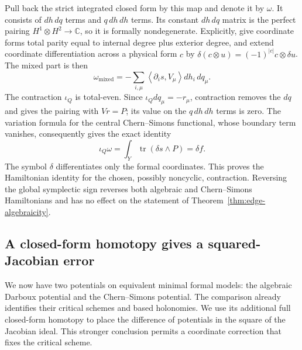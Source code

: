 Pull back the strict integrated closed form by this map and denote it
by \(\omega\).  It consists of \(dh\,dq\) terms and
\(q\,dh\,dh\) terms.  Its constant \(dh\,dq\) matrix is the perfect
pairing \(H^1\otimes H^2\to\mathbb C\), so it is formally
nondegenerate.  Explicitly, give coordinate forms total parity equal
to internal degree plus exterior degree, and extend coordinate
differentiation across a physical form \(c\) by
\(\delta(c\otimes u)=(-1)^{|c|}c\otimes\delta u\).
The mixed part is then
\[
 \omega_{\mathrm{mixed}}
   =-\sum_{i,\mu}\left\langle\partial_i s,V_\mu\right\rangle
                                                  dh_i\,dq_\mu.
\]
The contraction \(\iota_Q\) is total-even.  Since
\(\iota_Qdq_\mu=-r_\mu\), contraction removes the \(dq\) and gives
the pairing with \(Vr=P\); its value on the \(q\,dh\,dh\) terms
is zero.  The variation formula for the central
Chern--Simons functional, whose boundary term vanishes, consequently
gives the exact identity
\begin{equation}
\label{eq:transferred-hamiltonian}
                 \iota_Q\omega
                   =\int_Y\operatorname{tr}(\delta s\wedge P)
                   =\delta f.
\end{equation}
The symbol \(\delta\) differentiates only the formal coordinates.
This proves the Hamiltonian identity for the chosen, possibly
noncyclic, contraction.  Reversing the global symplectic sign reverses
both algebraic and Chern--Simons Hamiltonians and has no effect on the
statement of Theorem~\ref{thm:edge-algebraicity}.

\subsection{A closed-form homotopy gives a squared-Jacobian error}

We now have two potentials on equivalent minimal formal models: the
algebraic Darboux potential and the Chern--Simons potential.  The
comparison already identifies their critical schemes and based
holonomies.  We use its additional full closed-form homotopy to place
the difference of potentials in the square of the Jacobian ideal.
This stronger conclusion permits a coordinate correction that fixes
the critical scheme.

